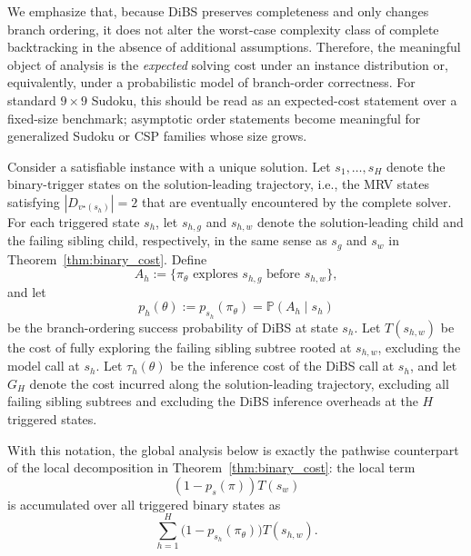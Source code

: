 \documentclass[lettersize,journal]{IEEEtran}
\begin{document}
We emphasize that, because DiBS preserves completeness and only
changes branch ordering, it does not alter the worst-case complexity
class of complete backtracking in the absence of additional assumptions.
Therefore, the meaningful object of analysis is the \emph{expected}
solving cost under an instance distribution or, equivalently, under a
probabilistic model of branch-order correctness. For standard
\(9\times 9\) Sudoku, this should be read as an expected-cost statement
over a fixed-size benchmark; asymptotic order statements become
meaningful for generalized Sudoku or CSP families whose size grows.

Consider a satisfiable instance with a unique solution. Let
\(s_1,\dots,s_H\) denote the binary-trigger states on the
solution-leading trajectory, i.e., the MRV states satisfying
\(|D_{v^\star(s_h)}|=2\) that are eventually encountered by the
complete solver. For each triggered state \(s_h\), let \(s_{h,g}\)
and \(s_{h,w}\) denote the solution-leading child and the failing
sibling child, respectively, in the same sense as \(s_g\) and \(s_w\)
in Theorem~\ref{thm:binary_cost}. Define
\[
A_h :=
\{\pi_\theta \text{ explores } s_{h,g}
\text{ before } s_{h,w}\},
\]
and let
\[
p_h(\theta)
:=
p_{s_h}(\pi_\theta)
=
\mathbb{P}(A_h\mid s_h)
\]
be the branch-ordering success probability of DiBS at state \(s_h\).
Let \(T(s_{h,w})\) be the cost of fully exploring the failing sibling
subtree rooted at \(s_{h,w}\), excluding the model call at \(s_h\).
Let \(\tau_h(\theta)\) be the inference cost of the DiBS call at
\(s_h\), and let \(G_H\) denote the cost incurred along the
solution-leading trajectory, excluding all failing sibling subtrees
and excluding the DiBS inference overheads at the \(H\) triggered states.

With this notation, the global analysis below is exactly the pathwise
counterpart of the local decomposition in Theorem~\ref{thm:binary_cost}:
the local term
\[
(1-p_s(\pi))T(s_w)
\]
is accumulated over all triggered binary states as
\[
\sum_{h=1}^{H}
\bigl(1-p_{s_h}(\pi_\theta)\bigr)T(s_{h,w}).
\]
\end{document}
